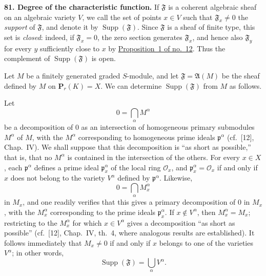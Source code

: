 
\medskip
{}\label{fac:III:6:no:81}
\textbf{81. Degree of the characteristic function.}
If $\mathfrak F$ is a coherent algebraic sheaf on an algebraic variety
$V$, we call the set of points $x\in V$ such that
$\mathfrak F_x\neq0$ the \label{fac:III:6:no:81:def:support}
\textit{support} of $\mathfrak F$, and denote it by
$\operatorname{Supp}(\mathfrak F)$. Since $\mathfrak F$ is a sheaf of
finite type, this set is \textit{closed}: indeed, if
$\mathfrak F_x=0$, the zero section generates $\mathfrak F_x$, and
hence also $\mathfrak F_y$ for every $y$ sufficiently close to $x$ by
\hyperref[fac:I:2:no:12:prop:1]{Proposition~1 of no.~12}. Thus the
complement of $\operatorname{Supp}(\mathfrak F)$ is open.

Let $M$ be a finitely generated graded $S$-module, and let
$\mathfrak F=\mathfrak A(M)$ be the sheaf defined by $M$ on
$\mathbf P_r(K)=X$. We can determine $\operatorname{Supp}(\mathfrak F)$
from $M$ as follows.

Let
\label{fac:III:6:no:81:primary-decomposition}
\[
0=\bigcap_\alpha M^\alpha
\]
be a decomposition of $0$ as an intersection of homogeneous primary
submodules $M^\alpha$ of $M$, with the $M^\alpha$ corresponding to
homogeneous prime ideals $\mathfrak p^\alpha$ (cf.~[12], Chap.~IV).
We shall suppose that this decomposition is ``as short as possible,''
that is, that no $M^\alpha$ is contained in the intersection of the
others. For every $x\in X$, each $\mathfrak p^\alpha$ defines a prime
ideal $\mathfrak p_x^\alpha$ of the local ring $\mathcal O_x$, and
$\mathfrak p_x^\alpha=\mathcal O_x$ if and only if $x$ does not belong
to the variety $V^\alpha$ defined by $\mathfrak p^\alpha$. Likewise,
\label{fac:III:6:no:81:localized-primary-decomposition}
\[
0=\bigcap_\alpha M_x^\alpha
\]
in $M_x$, and one readily verifies that this gives a primary
decomposition of $0$ in $M_x$, with the $M_x^\alpha$ corresponding to
the prime ideals $\mathfrak p_x^\alpha$. If $x\notin V^\alpha$, then
$M_x^\alpha=M_x$; restricting to the $M_x^\alpha$ for which
$x\in V^\alpha$ gives a decomposition ``as short as possible''
(cf.~[12], Chap.~IV, th.~4, where analogous results are established).
It follows immediately that $M_x\neq0$ if and only if $x$ belongs to
one of the varieties $V^\alpha$; in other words,
\label{fac:III:6:no:81:formula:support-union}
\[
\operatorname{Supp}(\mathfrak F)=\bigcup_\alpha V^\alpha.
\]

